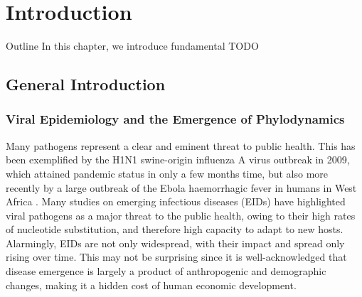 \chapter{Introduction}

\begin{remark}{Outline}
In this chapter, we introduce fundamental 
TODO
\end{remark}

\section{General Introduction}

\subsection{Viral Epidemiology and the Emergence of Phylodynamics}

Many pathogens represent a clear and eminent threat to public health. 
This has been exemplified by the H1N1 swine-origin influenza A virus outbreak in 2009, %
which attained pandemic status in only a few months time, but also more recently by a large outbreak of the Ebola haemorrhagic fever in humans in West Africa \citep{Dudas2014}. 
Many studies on emerging infectious diseases (EIDs) have highlighted viral pathogens as a major threat to the public health, owing to their high rates of nucleotide substitution, and therefore high capacity to adapt to new hosts. 
Alarmingly, EIDs are not only widespread, with their impact and spread only rising over time. %
This may not be surprising since it is well-acknowledged that disease emergence is largely a product of anthropogenic and demographic changes, making it a hidden cost of human economic development.
 
